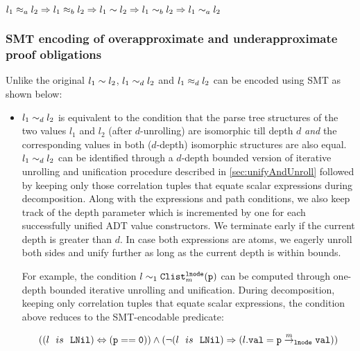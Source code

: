 \begin{center}
$l_1\approx_al_2 \Rightarrow l_1\approx_bl_2 \Rightarrow l_1\sim{}l_2 \Rightarrow l_1\sim_bl_2 \Rightarrow l_1\sim_al_2$
\end{center}


\subsubsection{SMT encoding of overapproximate and underapproximate proof obligations}
\label{sec:ouapprox}
Unlike the original \recursiveRelation{} $l_1\sim{}l_2$,
$l_1\sim_dl_2$ and
$l_1\approx_dl_2$ can be encoded using SMT as shown below:
\begin{itemize}
\item $l_1\sim_dl_2$ is equivalent to the condition
that the parse tree structures
of the two values $l_1$ and $l_2$ (after $d$-unrolling)
are isomorphic till depth $d$ {\em and} the
corresponding values in both ($d$-depth)
isomorphic structures
are also equal.
$l_1\sim_dl_2$ can be identified through a $d$-depth bounded version of iterative unrolling and unification procedure
described in \cref{sec:unifyAndUnroll} followed by keeping only those correlation tuples that equate scalar expressions during decomposition.
Along with the expressions and path conditions, we also keep track of the depth parameter which is incremented by one for each successfully unified ADT value constructors. 
We terminate early if the current depth is greater than $d$.
In case both expressions are atoms, we eagerly unroll both sides and unify further as long as the current depth is within bounds.


For example, the condition $l\sim_1{\tt Clist}^{{\tt lnode}}_{m}({\tt p})$ can be computed
through one-depth bounded iterative unrolling and unification.
During decomposition, keeping only correlation tuples that equate scalar expressions,
the condition above
reduces to the SMT-encodable predicate:
\begin{small}
$$
((l\ \ is\ \ {\tt LNil}) \Leftrightarrow {\tt (p == 0)}) \land (\neg(l\ \ is\ \ {\tt LNil})\Rightarrow(l{\tt.val}={\tt p} \overset{m}{\rightarrow}_{{\tt lnode}} {\tt val}))
$$
\end{small}



\end{itemize}
